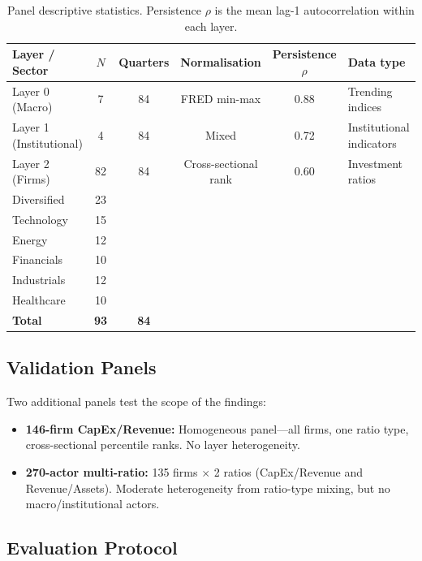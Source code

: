 \documentclass[11pt,a4paper]{article}
\begin{document}
\begin{table}[ht]
\centering
\caption{Panel descriptive statistics. Persistence $\rho$ is the mean lag-1 autocorrelation within each layer.}
\label{tab:panel_stats}
\small
\begin{tabular}{lccccl}
\toprule
Layer / Sector & $N$ & Quarters & Normalisation & Persistence $\rho$ & Data type \\
\midrule
Layer 0 (Macro) & 7 & 84 & FRED min-max & 0.88 & Trending indices \\
Layer 1 (Institutional) & 4 & 84 & Mixed & 0.72 & Institutional indicators \\
Layer 2 (Firms) & 82 & 84 & Cross-sectional rank & 0.60 & Investment ratios \\
\midrule
\quad Diversified & 23 & & & & \\
\quad Technology & 15 & & & & \\
\quad Energy & 12 & & & & \\
\quad Financials & 10 & & & & \\
\quad Industrials & 12 & & & & \\
\quad Healthcare & 10 & & & & \\
\midrule
\textbf{Total} & \textbf{93} & \textbf{84} & & & \\
\bottomrule
\end{tabular}
\end{table}

\subsection{Validation Panels}

Two additional panels test the scope of the findings:

\begin{itemize}[nosep]
  \item \textbf{146-firm CapEx/Revenue:} Homogeneous panel---all firms, one ratio type, cross-sectional percentile ranks. No layer heterogeneity.
  \item \textbf{270-actor multi-ratio:} 135 firms $\times$ 2 ratios (CapEx/Revenue and Revenue/Assets). Moderate heterogeneity from ratio-type mixing, but no macro/institutional actors.
\end{itemize}

\subsection{Evaluation Protocol}
\end{document}
